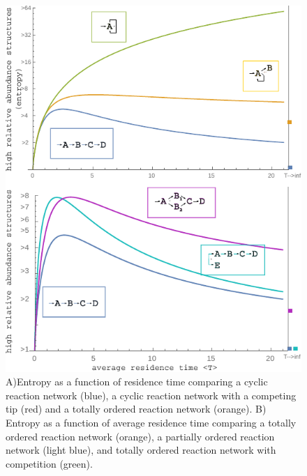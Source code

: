 \documentclass[twocolumn]{article}
\begin{document}
\begin{figure}[h]
    \includegraphics[width=\textwidth]{Figure_3.pdf}
	\caption{A)Entropy as a function of residence time comparing a cyclic reaction network (blue), a cyclic reaction network with a competing tip (red) and a totally ordered reaction network (orange). B) Entropy as a function of average residence time comparing a totally ordered reaction network (orange), a partially ordered reaction network (light blue), and totally ordered reaction network with competition (green).}
\end{figure}
\end{document}
